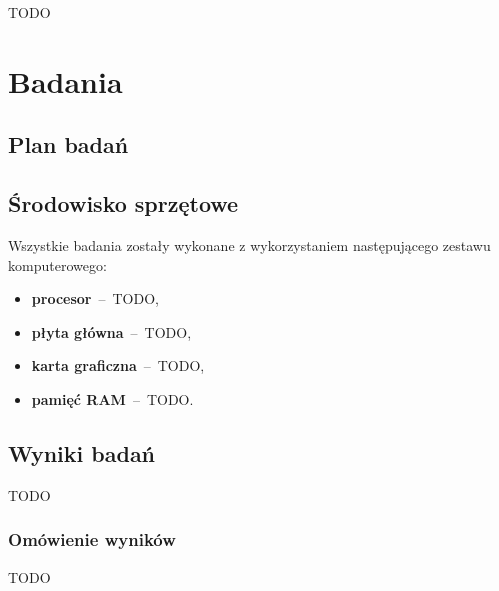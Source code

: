 

TODO
\chapter{Badania}

\section{Plan badań}

\section{Środowisko sprzętowe}
Wszystkie badania zostały wykonane z wykorzystaniem następującego zestawu komputerowego:
\begin{itemize}
    \item \textbf{procesor}~--~TODO,
    \item \textbf{płyta główna}~--~TODO,
    \item \textbf{karta graficzna}~--~TODO,
    \item \textbf{pamięć RAM}~--~TODO.
\end{itemize}

\section{Wyniki badań}
TODO

\subsection{Omówienie wyników}
TODO

